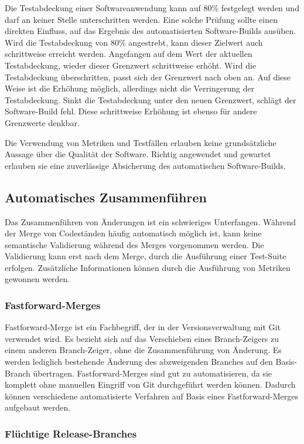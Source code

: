Die Testabdeckung einer Softwareanwendung kann auf 80\% festgelegt werden und darf an keiner Stelle unterschritten werden. Eine solche Prüfung sollte einen direkten Einfluss, auf das Ergebnis des automatisierten Software-Builds ausüben. Wird die Testabdeckung von 80\% angestrebt, kann dieser Zielwert auch schrittweise erreicht werden. Angefangen auf dem Wert der aktuellen Testabdeckung, wieder dieser Grenzwert schrittweise erhöht. Wird die Testabdeckung überschritten, passt sich der Grenzwert nach oben an. Auf diese Weise ist die Erhöhung möglich, allerdings nicht die Verringerung der Testabdeckung. Sinkt die Testabdeckung unter den neuen Grenzwert, schlägt der Software-Build fehl. Diese schrittweise Erhöhung ist ebenso für andere Grenzwerte denkbar.

Die Verwendung von Metriken und Testfällen erlauben keine grundsätzliche Aussage über die Qualität der Software. Richtig angewendet und gewartet erlauben sie eine zuverlässige Absicherung des automatischen Software-Builds.

\subsection{Automatisches Zusammenführen}

Das Zusammenführen von Änderungen ist ein schwieriges Unterfangen. Während der Merge von Codeständen häufig automatisch möglich ist, kann keine semantische Validierung während des Merges vorgenommen werden. Die Validierung kann erst nach dem Merge, durch die Ausführung einer Test-Suite erfolgen. Zusätzliche Informationen können durch die Ausführung von Metriken gewonnen werden.

\subsubsection{Fastforward-Merges}

Fastforward-Merge ist ein Fachbegriff, der in der Versionsverwaltung mit Git verwendet wird. Es bezieht sich auf das Verschieben eines Branch-Zeigers zu einem anderen Branch-Zeiger, ohne die Zusammenführung von Änderung. Es werden lediglich bestehende Änderung des abzweigenden Branches auf den Basis-Branch übertragen.
Fastforward-Merges sind gut zu automatisieren, da sie komplett ohne manuellen Eingriff von Git durchgeführt werden können. Dadurch können verschiedene automatisierte Verfahren auf Basis eines Fastforward-Merges aufgebaut werden.

\subsubsection{Flüchtige Release-Branches}
\label{temporary-releases}

